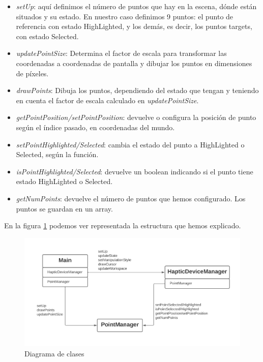 \documentclass[a4paper,11pt, oneside]{book}
\begin{document}
\begin{itemize}
	\item \textit{setUp}: aquí definimos el número de puntos que hay en la escena, dónde están situados y su estado. En nuestro caso definimos 9 puntos: el punto de referencia con estado HighLighted, y los demás, es decir, los puntos targets, con estado Selected.
	
	\item \textit{updatePointSize}: Determina el factor de escala para transformar las coordenadas a coordenadas de pantalla y dibujar los puntos en dimensiones de píxeles.
	
	\item \textit{drawPoints}: Dibuja los puntos, dependiendo del estado que tengan y teniendo en cuenta el factor de escala calculado en \textit{updatePointSize}.
	
	\item \textit{getPointPosition/setPointPosition}: devuelve o configura la posición de punto según el índice pasado, en coordenadas del mundo.
	
	\item \textit{setPointHighlighted/Selected}: cambia el estado del punto a HighLighted o Selected, según la función.
	
	\item \textit{isPointHighlighted/Selected}: devuelve un boolean indicando si el punto tiene estado HighLighted o Selected.
	
	\item \textit{getNumPoints}: devuelve el número de puntos que hemos configurado. Los puntos se guardan en un array.
\end{itemize}

En la figura \ref{fig:clases} podemos ver representada la estructura que hemos explicado.


\begin{figure}[H]
	
		\centering
		\includegraphics[width=\linewidth]{diagrama}
		\caption{Diagrama de clases}
		\label{fig:clases}

\end{figure}
\end{document}
